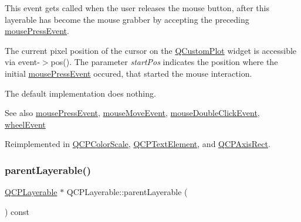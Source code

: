 This event gets called when the user releases the mouse button, after this layerable has become the mouse grabber by accepting the preceding \mbox{\hyperlink{class_q_c_p_layerable_af6567604818db90f4fd52822f8bc8376}{mouse\+Press\+Event}}.

The current pixel position of the cursor on the \mbox{\hyperlink{class_q_custom_plot}{Q\+Custom\+Plot}} widget is accessible via {\ttfamily event-\/$>$pos()}. The parameter {\itshape start\+Pos} indicates the position where the initial \mbox{\hyperlink{class_q_c_p_layerable_af6567604818db90f4fd52822f8bc8376}{mouse\+Press\+Event}} occured, that started the mouse interaction.

The default implementation does nothing.

\begin{DoxySeeAlso}{See also}
\mbox{\hyperlink{class_q_c_p_layerable_af6567604818db90f4fd52822f8bc8376}{mouse\+Press\+Event}}, \mbox{\hyperlink{class_q_c_p_layerable_a9eee1ba47fd69be111059ca3881933e4}{mouse\+Move\+Event}}, \mbox{\hyperlink{class_q_c_p_layerable_a4171e2e823aca242dd0279f00ed2de81}{mouse\+Double\+Click\+Event}}, \mbox{\hyperlink{class_q_c_p_layerable_a47dfd7b8fd99c08ca54e09c362b6f022}{wheel\+Event}} 
\end{DoxySeeAlso}


Reimplemented in \mbox{\hyperlink{class_q_c_p_color_scale_a6a35dd39ab4e5cb2d7b29ebb4d5b61b0}{Q\+C\+P\+Color\+Scale}}, \mbox{\hyperlink{class_q_c_p_text_element_acfcbaf9b1da18745e72726aafb39c855}{Q\+C\+P\+Text\+Element}}, and \mbox{\hyperlink{class_q_c_p_axis_rect_a6c89b988d3a0b93c0878f0ebdb5037f4}{Q\+C\+P\+Axis\+Rect}}.

\mbox{\label{class_q_c_p_layerable_aa78b7e644d2c519e1a9a6f2ac5fcd858}} 
\subsubsection{\texorpdfstring{parent\+Layerable()}{parentLayerable()}}
{\footnotesize\ttfamily \mbox{\hyperlink{class_q_c_p_layerable}{Q\+C\+P\+Layerable}} $\ast$ Q\+C\+P\+Layerable\+::parent\+Layerable (\begin{DoxyParamCaption}{ }\end{DoxyParamCaption}) const\hspace{0.3cm}{\ttfamily [inline]}}

